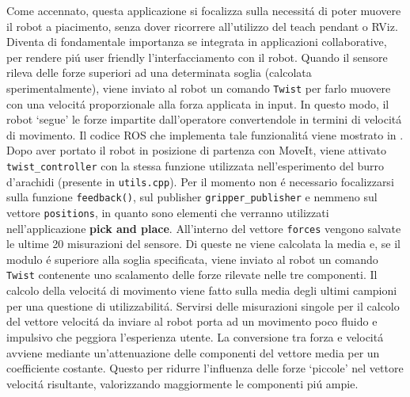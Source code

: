 Come accennato, questa applicazione si focalizza sulla necessit\'{a} di poter muovere il robot a piacimento, senza dover 
ricorrere all'utilizzo del teach pendant o RViz. 
Diventa di fondamentale importanza se integrata in applicazioni collaborative, per rendere pi\'{u} user friendly l'interfacciamento 
con il robot. 
Quando il sensore rileva delle forze superiori ad una determinata soglia (calcolata sperimentalmente), viene inviato al robot un 
comando \verb|Twist| per farlo muovere con una velocit\'{a} proporzionale alla forza applicata in input. In questo modo, il robot `segue' 
le forze impartite dall'operatore convertendole in termini di velocit\'{a} di movimento. 
Il codice ROS che implementa tale funzionalit\'{a} viene mostrato in \cite{force_follower}. 
Dopo aver portato il robot in posizione di partenza con MoveIt, viene attivato \verb|twist_controller| con la stessa funzione 
utilizzata nell'esperimento del burro d'arachidi (presente in \verb|utils.cpp|). 
Per il momento non \'{e} necessario focalizzarsi sulla funzione \verb|feedback()|, sul publisher \verb|gripper_publisher| e nemmeno 
sul vettore \verb|positions|, in quanto sono elementi che verranno utilizzati nell'applicazione \textbf{pick and place}. 
All'interno del vettore \verb|forces| vengono salvate le ultime 20 misurazioni del sensore. Di queste ne viene calcolata la media 
e, se il modulo \'{e} superiore alla soglia specificata, viene inviato al robot un comando \verb|Twist| contenente uno scalamento delle 
forze rilevate nelle tre componenti. Il calcolo della velocit\'{a} di movimento viene fatto sulla media degli ultimi campioni 
per una questione di utilizzabilit\'{a}. Servirsi delle misurazioni singole per il calcolo del vettore velocit\'{a} da inviare al robot 
porta ad un movimento poco fluido e impulsivo che peggiora l'esperienza utente. 
La conversione tra forza e velocit\'{a} avviene mediante un'attenuazione delle componenti del vettore media per un coefficiente 
costante. Questo per ridurre l'influenza delle forze `piccole' nel vettore velocit\'{a} risultante, valorizzando maggiormente le 
componenti pi\'{u} ampie. 